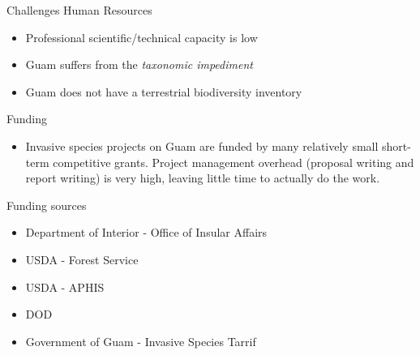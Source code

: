 \documentclass[]{beamer}
\begin{document}

\begin{frame}{Challenges}
	Human Resources
	\begin{itemize}
		\item Professional scientific/technical capacity is low
		\item Guam suffers from the \textit{taxonomic impediment}
		\item Guam does not have a terrestrial biodiversity inventory
	\end{itemize}
	Funding
	\begin{itemize}
		\item Invasive species projects on Guam are funded by many relatively small short-term competitive grants. Project management overhead (proposal writing and report writing) is very high, leaving little time to actually do the work.
	\end{itemize}
\end{frame}

\begin{frame}{Funding sources}
	\begin{itemize}
	   \item Department of Interior - Office of Insular Affairs
	   \item USDA - Forest Service
	   \item USDA - APHIS
	   \item DOD
	   \item Government of Guam - Invasive Species Tarrif
	\end{itemize}		
\end{frame}
\end{document}
